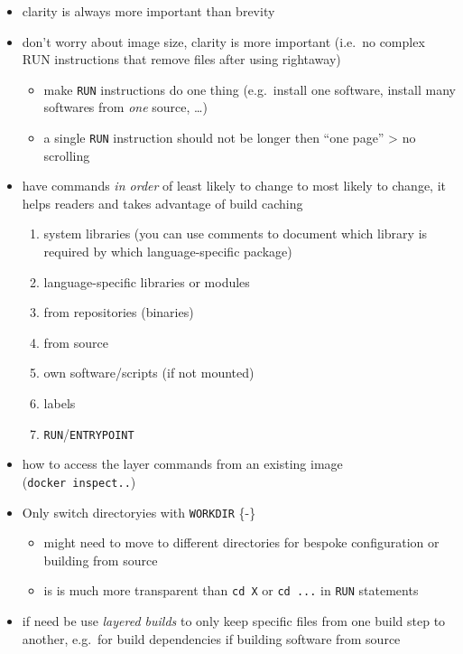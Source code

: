 \documentclass[10pt,letterpaper]{article}
\providecommand{\tightlist}{%
  \setlength{\itemsep}{0pt}\setlength{\parskip}{0pt}}
\begin{document}
\begin{itemize}
\tightlist
\item
  clarity is always more important than brevity
\item
  don't worry about image size, clarity is more important (i.e.~no
  complex RUN instructions that remove files after using rightaway)

  \begin{itemize}
  \tightlist
  \item
    make \texttt{RUN} instructions do one thing (e.g.~install one
    software, install many softwares from \emph{one} source, \ldots{})
  \item
    a single \texttt{RUN} instruction should not be longer then ``one
    page'' \textgreater{} no scrolling
  \end{itemize}
\item
  have commands \emph{in order} of least likely to change to most likely
  to change, it helps readers and takes advantage of build caching

  \begin{enumerate}
  \def\labelenumi{\arabic{enumi}.}
  \tightlist
  \item
    system libraries (you can use comments to document which library is
    required by which language-specific package)
  \item
    language-specific libraries or modules
  \item
    from repositories (binaries)
  \item
    from source
  \item
    own software/scripts (if not mounted)
  \item
    labels
  \item
    \texttt{RUN}/\texttt{ENTRYPOINT}
  \end{enumerate}
\item
  how to access the layer commands from an existing image
  (\texttt{docker\ inspect..})
\item
  Only switch directoryies with \texttt{WORKDIR} \{-\}

  \begin{itemize}
  \tightlist
  \item
    might need to move to different directories for bespoke
    configuration or building from source
  \item
    is is much more transparent than \texttt{cd\ X} or \texttt{cd\ ...}
    in \texttt{RUN} statements
  \end{itemize}
\item
  if need be use \emph{layered builds} to only keep specific files from
  one build step to another, e.g.~for build dependencies if building
  software from source
\end{itemize}
\end{document}
